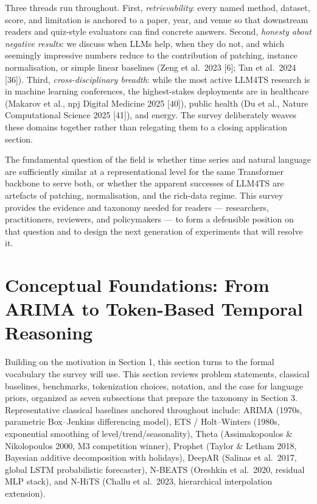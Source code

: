 \documentclass{article}
\begin{document}
Three threads run throughout. First, \emph{retrievability}: every named method, dataset, score, and limitation is anchored to a paper, year, and venue so that downstream readers and quiz-style evaluators can find concrete answers. Second, \emph{honesty about negative results}: we discuss when LLMs help, when they do not, and which seemingly impressive numbers reduce to the contribution of patching, instance normalisation, or simple linear baselines (Zeng et al.~2023 {[}6{]}; Tan et al.~2024 {[}36{]}). Third, \emph{cross-disciplinary breadth}: while the most active LLM4TS research is in machine learning conferences, the highest-stakes deployments are in healthcare (Makarov et al., npj Digital Medicine 2025 {[}40{]}), public health (Du et al., Nature Computational Science 2025 {[}41{]}), and energy. The survey deliberately weaves these domains together rather than relegating them to a closing application section.

The fundamental question of the field is whether time series and natural language are sufficiently similar at a representational level for the same Transformer backbone to serve both, or whether the apparent successes of LLM4TS are artefacts of patching, normalisation, and the rich-data regime. This survey provides the evidence and taxonomy needed for readers --- researchers, practitioners, reviewers, and policymakers --- to form a defensible position on that question and to design the next generation of experiments that will resolve it.

\section{Conceptual Foundations: From ARIMA to Token-Based Temporal Reasoning}\label{conceptual-foundations-from-arima-to-token-based-temporal-reasoning}

Building on the motivation in Section 1, this section turns to the formal vocabulary the survey will use. This section reviews problem statements, classical baselines, benchmarks, tokenization choices, notation, and the case for language priors, organized as seven subsections that prepare the taxonomy in Section 3. Representative classical baselines anchored throughout include: ARIMA (1970s, parametric Box--Jenkins differencing model), ETS / Holt--Winters (1980s, exponential smoothing of level/trend/seasonality), Theta (Assimakopoulos \& Nikolopoulos 2000, M3 competition winner), Prophet (Taylor \& Letham 2018, Bayesian additive decomposition with holidays), DeepAR (Salinas et al.~2017, global LSTM probabilistic forecaster), N-BEATS (Oreshkin et al.~2020, residual MLP stack), and N-HiTS (Challu et al.~2023, hierarchical interpolation extension).
\end{document}
